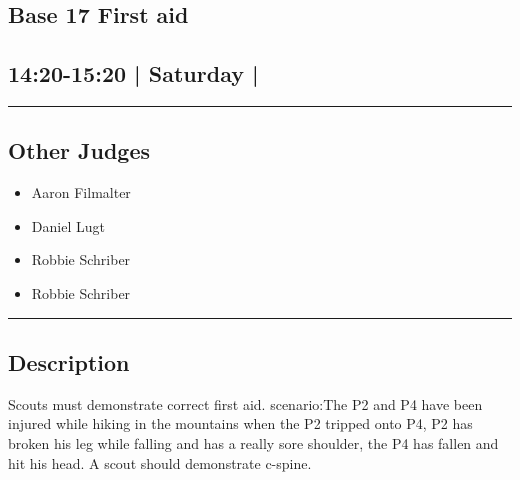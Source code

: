 \documentclass[10pt, A5]{article}
\begin{document}
	

		\begin{framed}
			\begin{minipage}{\textwidth}

			\setcounter{section}{46}
							\section{\faStar \: Base 17 \faStar \: First aid}
						
			\subsection*{14:20-15:20 | Saturday | }

			\vspace{0.25cm}
			\hrule
			\vspace{0.25cm}


			\subsection*{Other Judges}
							

				\begin{multicols}{2}

			\begin{itemize}
											\item Aaron Filmalter
											\item Daniel Lugt
											\item Robbie Schriber
								\end{itemize}

			\vfill\null
			\columnbreak

			\begin{itemize}
											\item Robbie Schriber
								\end{itemize}

			\vfill\null

			\end{multicols}

			\vspace{0.25cm}
			\hrule
			\vspace{0.25cm}

			\begin{minipage}{\textwidth}
			\subsection*{\faListAlt \: Description}
			Scouts must demonstrate correct first aid. scenario:The P2 and P4 have been injured while hiking in the mountains when the P2 tripped onto P4, P2 has broken his leg while falling and has a really sore shoulder, the P4 has fallen and hit his head. A scout should demonstrate c-spine.
			\end{minipage}


	\end{minipage}
	\end{framed}
\end{document}
